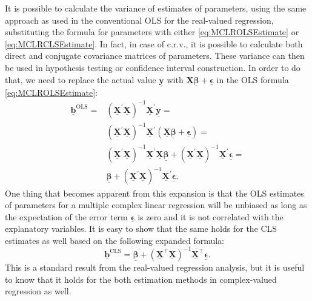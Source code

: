 \documentclass[
]{book}
\begin{document}
It is possible to calculate the variance of estimates of parameters, using the same approach as used in the conventional OLS for the real-valued regression, substituting the formula for parameters with either \eqref{eq:MCLROLSEstimate} or \eqref{eq:MCLRCLSEstimate}. In fact, in case of c.r.v., it is possible to calculate both direct and conjugate covariance matrices of parameters. These variance can then be used in hypothesis testing or confidence interval construction. In order to do that, we need to replace the actual value \(\underline{\mathbf{y}}\) with \(\underline{\mathbf{X}} \underline{\boldsymbol{\beta}} + \underline{\boldsymbol{\epsilon}}\) in the OLS formula \eqref{eq:MCLROLSEstimate}:
\begin{equation}
    \begin{aligned}
    \underline{\boldsymbol{b}}^{\text{OLS}} =
        & \left( \underline{\mathbf{X}}^\prime \underline{\mathbf{X}} \right)^{-1} \underline{\mathbf{X}}^\prime \underline{\mathbf{y}} = \\
        & \left( \underline{\mathbf{X}}^\prime \underline{\mathbf{X}} \right)^{-1} \underline{\mathbf{X}}^\prime (\underline{\mathbf{X}} \underline{\boldsymbol{\beta}} + \underline{\boldsymbol{\epsilon}}) = \\
        & \left( \underline{\mathbf{X}}^\prime \underline{\mathbf{X}} \right)^{-1} \underline{\mathbf{X}}^\prime \underline{\mathbf{X}} \underline{\boldsymbol{\beta}} + \left( \underline{\mathbf{X}}^\prime \underline{\mathbf{X}} \right)^{-1} \underline{\mathbf{X}}^\prime \underline{\boldsymbol{\epsilon}} = \\
        & \underline{\boldsymbol{\beta}} + \left( \underline{\mathbf{X}}^\prime \underline{\mathbf{X}} \right)^{-1} \underline{\mathbf{X}}^\prime \underline{\boldsymbol{\epsilon}} .
    \end{aligned}
    \label{eq:MCLROLSExpansion}
\end{equation}
One thing that becomes apparent from this expansion is that the OLS estimates of parameters for a multiple complex linear regression will be unbiased as long as the expectation of the error term \(\underline{\boldsymbol{\epsilon}}\) is zero and it is not correlated with the explanatory variables. It is easy to show that the same holds for the CLS estimates as well based on the following expanded formula:
\begin{equation}
    \underline{\boldsymbol{b}}^{\text{CLS}} = \underline{\boldsymbol{\beta}} + \left( \underline{\mathbf{X}}^\top \underline{\mathbf{X}} \right)^{-1} \underline{\mathbf{X}}^\top \underline{\boldsymbol{\epsilon}} .
    \label{eq:MCLRCLSExpansion}
\end{equation}
This is a standard result from the real-valued regression analysis, but it is useful to know that it holds for the both estimation methods in complex-valued regression as well.
\end{document}
